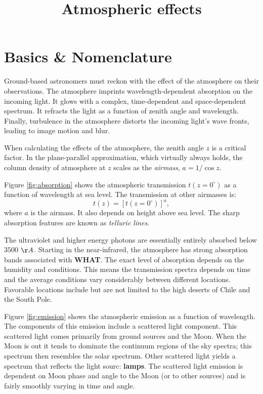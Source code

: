 \title{\bf Atmospheric effects}

\section{Basics \& Nomenclature}

Ground-based astronomers must reckon with the effect of the atmosphere
on their observations. The atmosphere imprints wavelength-dependent
absorption on the incoming light. It glows with a complex,
time-dependent and space-dependent spectrum.  It refracts the light as
a function of zenith angle and wavelength. Finally, turbulence in the
atmosphere distorts the incoming light's wave fronts, leading to image
motion and blur.

When calculating the effects of the atmosphere, the zenith angle $z$
is a critical factor. In the plane-parallel approximation, which
virtually always holds, the column density of atmosphere at $z$ scales
as the {\it airmass}, $a = 1 / \cos z$. 

Figure \ref{fig:absorption} shows the atmospheric transmission
$t(z=0^\circ)$ as a function of wavelength at sea level. The
transmission at other airmasses is:
\begin{equation}
t(z) = [t(z=0^\circ)]^a,
\end{equation}
where $a$ is the airmass. It also depends on height above sea level.
The sharp absorption features are known as {\it telluric lines}.

The ultraviolet and higher energy photons are essentially entirely
absorbed below $3500$ $\AA$. Starting in the near-infrared, the
atmosphere has strong absorption bands associated with {\bf WHAT}.
The exact level of absorption depends on the humidity and
conditions. This means the transmission spectra depends on time and
the average conditions vary considerably between different
locations. Favorable locations include but are not limited to the high
deserts of Chile and the South Pole.

Figure \ref{fig:emission} shows the atmospheric emission as a function
of wavelength. The components of this emission include a scattered
light component. This scattered light comes primarily from ground
sources and the Moon. When the Moon is out it tends to dominate the
continuum regions of the sky spectra; this spectrum then resembles the
solar spectrum. Other scattered light yields a spectrum that reflects
the light sourc: {\bf lamps}. The scattered light emission is
dependent on Moon phase and angle to the Moon (or to other sources)
and is fairly smoothly varying in time and angle.

